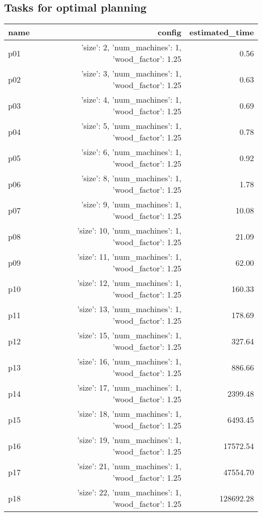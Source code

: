 \documentclass{article}
\begin{document}
                                \subsection*{Tasks for optimal planning}
                                
                            \begin{center}
                            \scriptsize
                            \begin{tabular}{@{}l|r|r@{}}
                            name & config & estimated\_time\\\midrule
                              p01&{'size': 2, 'num\_machines': 1, 'wood\_factor': 1.25}&0.56\\
  p02&{'size': 3, 'num\_machines': 1, 'wood\_factor': 1.25}&0.63\\
  p03&{'size': 4, 'num\_machines': 1, 'wood\_factor': 1.25}&0.69\\
  p04&{'size': 5, 'num\_machines': 1, 'wood\_factor': 1.25}&0.78\\
  p05&{'size': 6, 'num\_machines': 1, 'wood\_factor': 1.25}&0.92\\
  p06&{'size': 8, 'num\_machines': 1, 'wood\_factor': 1.25}&1.78\\
  p07&{'size': 9, 'num\_machines': 1, 'wood\_factor': 1.25}&10.08\\
  p08&{'size': 10, 'num\_machines': 1, 'wood\_factor': 1.25}&21.09\\
  p09&{'size': 11, 'num\_machines': 1, 'wood\_factor': 1.25}&62.00\\
  p10&{'size': 12, 'num\_machines': 1, 'wood\_factor': 1.25}&160.33\\
  p11&{'size': 13, 'num\_machines': 1, 'wood\_factor': 1.25}&178.69\\
  p12&{'size': 15, 'num\_machines': 1, 'wood\_factor': 1.25}&327.64\\
  p13&{'size': 16, 'num\_machines': 1, 'wood\_factor': 1.25}&886.66\\
  p14&{'size': 17, 'num\_machines': 1, 'wood\_factor': 1.25}&2399.48\\
  p15&{'size': 18, 'num\_machines': 1, 'wood\_factor': 1.25}&6493.45\\
  p16&{'size': 19, 'num\_machines': 1, 'wood\_factor': 1.25}&17572.54\\
  p17&{'size': 21, 'num\_machines': 1, 'wood\_factor': 1.25}&47554.70\\
  p18&{'size': 22, 'num\_machines': 1, 'wood\_factor': 1.25}&128692.28\\

\end{tabular}
\end{center}
\end{document}
